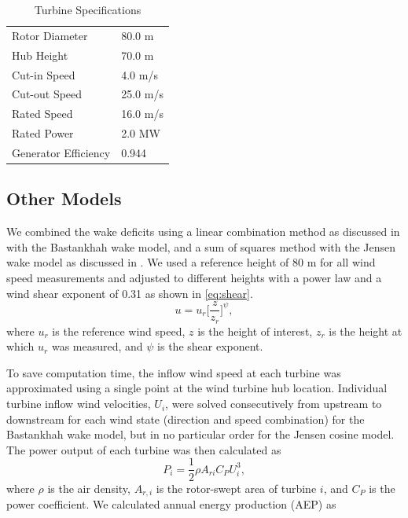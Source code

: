 \documentclass[journal abbreviation, manuscript]{copernicus}
\begin{document}
	\begin{table}[h!]
		\caption{Turbine Specifications}
		\label{tab:v80}
		\centering
		\begin{tabular}{l l}
			\toprule
			Rotor Diameter & 80.0 m\\
			Hub Height & 70.0 m \\
			Cut-in Speed & 4.0 m/s\\
			Cut-out Speed & 25.0 m/s \\
			Rated Speed & 16.0 m/s \\
			Rated Power & 2.0 MW \\
			Generator Efficiency & 0.944 \\
			\bottomrule
		\end{tabular}
	\end{table}
	
	\subsection{Other Models}
	We combined the wake deficits using a linear combination method as discussed in \cite{niayifar2016} with the Bastankhah wake model, and a sum of squares method with the Jensen wake model as discussed in \cite{katic1986}. We used a reference height of 80 m for all wind speed measurements and adjusted to different heights with a power law and a wind shear exponent of 0.31 as shown in \ref{eq:shear}. 
	\begin{equation} \label{eq:shear}
		u = u_r\bigg[\frac{z}{z_r}\bigg]^\psi,
	\end{equation}
	where $u_r$ is the reference wind speed, $z$ is the height of interest, $z_r$ is the height at which $u_r$ was measured, and $\psi$ is the shear exponent.
	
	To save computation time, the inflow wind speed at each turbine was approximated using a single point at the wind turbine hub location. Individual turbine inflow wind velocities, $U_i$, were solved consecutively from upstream to downstream for each wind state (direction and speed combination) for the Bastankhah wake model, but in no particular order for the Jensen cosine model. The power output of each turbine was then calculated as
	\begin{equation}\label{eq:power}
		P_i = \frac{1}{2}\rho A_{ri}C_P U_i^3,
	\end{equation}
	where $\rho$ is the air density, $A_{r,i}$ is the rotor-swept area of turbine $i$, and $C_P$ is the power coefficient. We calculated annual energy production (AEP) as
	
\end{document}
